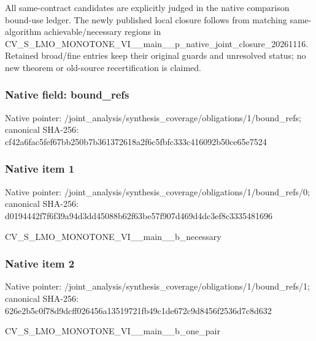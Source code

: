 \documentclass[10pt,a4paper]{article}
\begin{document}
\begingroup\raggedright\sloppy All same-contract candidates are explicitly judged in the native comparison bound-use ledger. The newly published local closure follows from matching same-algorithm achievable/\allowbreak{}necessary regions in CV\_\allowbreak{}S\_\allowbreak{}LMO\_\allowbreak{}MONOTONE\_\allowbreak{}VI\_\allowbreak{}\_\allowbreak{}main\_\allowbreak{}\_\allowbreak{}p\_\allowbreak{}native\_\allowbreak{}joint\_\allowbreak{}closure\_\allowbreak{}20261116. Retained broad/\allowbreak{}fine entries keep their original guards and unresolved status;\allowbreak{} no new theorem or old-source recertification is claimed.\par\endgroup

\subsubsection{Native field: bound\_\allowbreak{}refs}
Native pointer: /joint\_\allowbreak{}analysis/synthesis\_\allowbreak{}coverage/obligations/1/bound\_\allowbreak{}refs; canonical SHA-256: cf42a6fac5fef67bb250b7b361372618a2f6c5fbfc333c416092b50ce65e7524

\subsubsection{Native item 1}
Native pointer: /joint\_\allowbreak{}analysis/synthesis\_\allowbreak{}coverage/obligations/1/bound\_\allowbreak{}refs/0; canonical SHA-256: d0194442f7f6f39a94d3dd45088b62f63be57f907d469d4dc3ef8c3335481696

\begingroup\raggedright\sloppy CV\_\allowbreak{}S\_\allowbreak{}LMO\_\allowbreak{}MONOTONE\_\allowbreak{}VI\_\allowbreak{}\_\allowbreak{}main\_\allowbreak{}\_\allowbreak{}b\_\allowbreak{}necessary\par\endgroup

\subsubsection{Native item 2}
Native pointer: /joint\_\allowbreak{}analysis/synthesis\_\allowbreak{}coverage/obligations/1/bound\_\allowbreak{}refs/1; canonical SHA-256: 626e2b5c0f78d9dcff026456a13519721fb49c1de672c9d8456f2536d7c8d632

\begingroup\raggedright\sloppy CV\_\allowbreak{}S\_\allowbreak{}LMO\_\allowbreak{}MONOTONE\_\allowbreak{}VI\_\allowbreak{}\_\allowbreak{}main\_\allowbreak{}\_\allowbreak{}b\_\allowbreak{}one\_\allowbreak{}pair\par\endgroup
\end{document}
